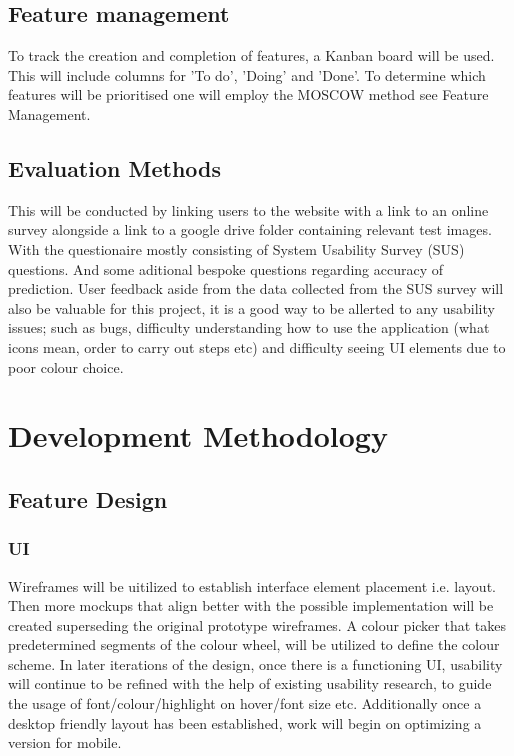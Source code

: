   \subsection{Feature management}
    To track the creation and completion of features, a Kanban board will be used. This will include columns for 'To do', 'Doing' and 'Done'.
    To determine which features will be prioritised one will employ the MOSCOW method see Feature Management.


  \subsection{Evaluation Methods}
    This will be conducted by linking users to the website with a link to an online survey alongside a link to a google drive folder containing relevant test images. With the questionaire mostly consisting of System Usability Survey (SUS) questions. And some aditional bespoke questions regarding accuracy of prediction. User feedback aside from the data collected from the SUS survey will also be valuable for this project, it is a good way to be allerted to any usability issues; such as bugs, difficulty understanding how to use the application (what icons mean, order to carry out steps etc) and difficulty seeing UI elements due to poor colour choice.

\section{Development Methodology}
  \subsection{Feature Design}
    \subsubsection{UI}
      Wireframes will be uitilized to establish interface element placement i.e. layout. Then more mockups that align better with the possible implementation will be created superseding the original prototype wireframes. A colour picker that takes predetermined segments of the colour wheel, will be utilized to define the colour scheme. In later iterations of the design, once there is a functioning UI, usability will continue to be refined with the help of existing usability research, to guide the usage of font/colour/highlight on hover/font size etc. Additionally once a desktop friendly layout has been established, work will begin on optimizing a version for mobile.
